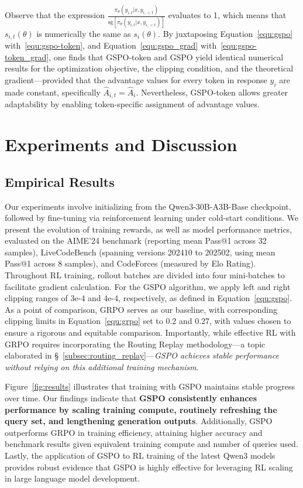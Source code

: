Observe that the expression $\frac{ \pi_{\theta} (y_{i,t} | x, y_{i,<t}) }{ \mathrm{sg} \left[ \pi_{\theta} (y_{i,t} | x, y_{i,<t}) \right] }$ evaluates to 1, which means that $s_{i,t}(\theta)$ is numerically the same as $s_{i}(\theta)$.
By juxtaposing Equation~\eqref{equ:gspo} with~\eqref{equ:gspo-token}, and Equation~\eqref{equ:gspo_grad} with~\eqref{equ:gspo-token_grad}, one finds that GSPO-token and GSPO yield identical numerical results for the optimization objective, the clipping condition, and the theoretical gradient—provided that the advantage values for every token in response $y_i$ are made constant, specifically $\widehat{A}_{i,t} = \widehat{A}_{i}$. Nevertheless, GSPO-token allows greater adaptability by enabling token-specific assignment of advantage values.

\section{Experiments and Discussion}

\subsection{Empirical Results}

Our experiments involve initializing from the Qwen3-30B-A3B-Base checkpoint, followed by fine-tuning via reinforcement learning under cold-start conditions. We present the evolution of training rewards, as well as model performance metrics, evaluated on the AIME'24 benchmark (reporting mean Pass@1 across 32 samples), LiveCodeBench (spanning versions 202410 to 202502, using mean Pass@1 across 8 samples), and CodeForces (measured by Elo Rating). Throughout RL training, rollout batches are divided into four mini-batches to facilitate gradient calculation. For the GSPO algorithm, we apply left and right clipping ranges of 3e-4 and 4e-4, respectively, as defined in Equation~\eqref{equ:gspo}. As a point of comparison, GRPO serves as our baseline, with corresponding clipping limits in Equation~\eqref{equ:grpo} set to 0.2 and 0.27, with values chosen to ensure a rigorous and equitable comparison. Importantly, while effective RL with GRPO requires incorporating the Routing Replay methodology—a topic elaborated in \S~\ref{subsec:routing_replay}—\textit{GSPO achieves stable performance without relying on this additional training mechanism}.

Figure~\ref{fig:results} illustrates that training with GSPO maintains stable progress over time. Our findings indicate that \textbf{GSPO consistently enhances performance by scaling training compute, routinely refreshing the query set, and lengthening generation outputs}. Additionally, GSPO outperforms GRPO in training efficiency, attaining higher accuracy and benchmark results given equivalent training compute and number of queries used. Lastly, the application of GSPO to RL training of the latest Qwen3 models provides robust evidence that GSPO is highly effective for leveraging RL scaling in large language model development.

